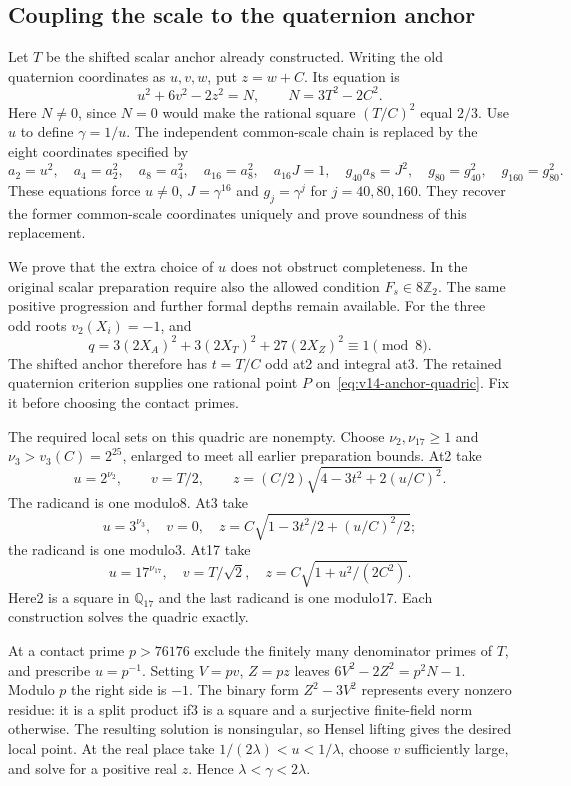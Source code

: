 \subsection{Coupling the scale to the quaternion anchor}
\label{subsec:v14-anchor}
Let $T$ be the shifted scalar anchor already constructed.
Writing the old quaternion coordinates as $u,v,w$, put
$z=w+C$. Its equation is
\begin{equation}\label{eq:v14-anchor-quadric}
 u^2+6v^2-2z^2=N,\qquad N=3T^2-2C^2.
\end{equation}
Here $N\ne0$, since $N=0$ would make the rational square
$(T/C)^2$ equal $2/3$.
Use $u$ to define $\gamma=1/u$. The independent common-scale
chain is replaced by the eight coordinates specified by
\[
 a_2=u^2,\quad a_4=a_2^2,\quad a_8=a_4^2,\quad
 a_{16}=a_8^2,\quad a_{16}J=1,\quad
 g_{40}a_8=J^2,\quad g_{80}=g_{40}^2,\quad
 g_{160}=g_{80}^2.
\]
These equations force $u\ne0$, $J=\gamma^{16}$ and
$g_j=\gamma^j$ for $j=40,80,160$. They recover the former
common-scale coordinates uniquely and prove soundness of
this replacement.

We prove that the extra choice of $u$ does not obstruct
completeness. In the original scalar preparation require also
the allowed condition $F_s\in8\mathbb Z_2$. The same positive
progression and further formal depths remain available.
For the three odd roots $v_2(X_i)=-1$, and
\[
 q=3(2X_A)^2+3(2X_T)^2+27(2X_Z)^2\equiv1\pmod8.
\]
The shifted anchor therefore has $t=T/C$ odd at2 and integral
at3. The retained quaternion criterion supplies one rational
point $P$ on~\eqref{eq:v14-anchor-quadric}.
Fix it before choosing the contact primes.

The required local sets on this quadric are nonempty. Choose
$\nu_2,\nu_{17}\geq1$ and
$\nu_3>v_3(C)=2^{25}$, enlarged to meet all earlier preparation
bounds. At2 take
\[
 u=2^{\nu_2},\qquad v=T/2,\qquad
 z=(C/2)\sqrt{4-3t^2+2(u/C)^2}.
\]
The radicand is one modulo8. At3 take
\[
 u=3^{\nu_3},\quad v=0,\quad
 z=C\sqrt{1-3t^2/2+(u/C)^2/2};
\]
the radicand is one modulo3. At17 take
\[
 u=17^{\nu_{17}},\quad v=T/\sqrt2,\quad
 z=C\sqrt{1+u^2/(2C^2)}.
\]
Here2 is a square in $\mathbb Q_{17}$ and the last radicand
is one modulo17. Each construction solves the quadric exactly.

At a contact prime $p>76176$ exclude the finitely many
denominator primes of $T$, and prescribe $u=p^{-1}$.
Setting $V=pv$, $Z=pz$ leaves
$6V^2-2Z^2=p^2N-1$.
Modulo $p$ the right side is $-1$. The binary form
$Z^2-3V^2$ represents every nonzero residue: it is a split
product if3 is a square and a surjective finite-field norm
otherwise. The resulting solution is nonsingular, so Hensel
lifting gives the desired local point. At the real place take
$1/(2\lambda)<u<1/\lambda$, choose $v$ sufficiently large,
and solve for a positive real $z$. Hence $\lambda<\gamma<2\lambda$.

